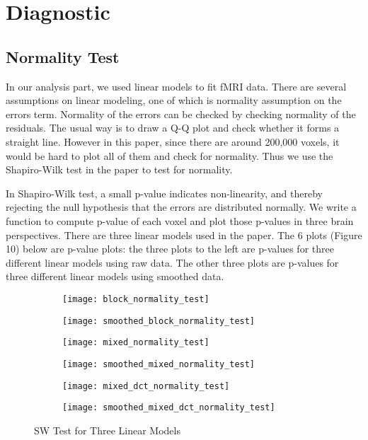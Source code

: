 \section{Diagnostic}

\subsection{Normality Test}

In our analysis part, we used linear models to fit fMRI data. There are several
assumptions on linear modeling, one of which is normality assumption on the 
errors term. Normality of the errors can be checked by checking normality of 
the residuals. The usual way is to draw a Q-Q plot and check whether it forms 
a straight line. However in this paper, since there are around 200,000 voxels,
it would be hard to plot all of them and check for normality. Thus we use 
the Shapiro-Wilk test in the paper to test for normality. \par

In Shapiro-Wilk test, a small p-value indicates non-linearity, and thereby rejecting 
the null hypothesis that the errors are distributed normally. We write a
function to compute p-value of each voxel and plot those p-values in three
brain perspectives. There are three linear models used in the paper. The 6 
plots (Figure 10) below are p-value plots: the three plots to the left are p-values 
for three different linear models using raw data. The other three plots are p-values 
for three different linear models using smoothed data. \par

\begin{figure}[!h]
\begin{subfigure}{.52\textwidth}
  \centering
  \texttt{[image: block\_normality\_test]}
\end{subfigure}%
\begin{subfigure}{.4\textwidth}
  \centering
  \texttt{[image: smoothed\_block\_normality\_test]}
\end{subfigure}
\begin{subfigure}{.52\textwidth}
  \centering
  \texttt{[image: mixed\_normality\_test]}
\end{subfigure}%
\begin{subfigure}{.4\textwidth}
  \centering
  \texttt{[image: smoothed\_mixed\_normality\_test]}
\end{subfigure}
\begin{subfigure}{.52\textwidth}
  \centering
  \texttt{[image: mixed\_dct\_normality\_test]}
\end{subfigure}%
\begin{subfigure}{.4\textwidth}
  \centering
  \texttt{[image: smoothed\_mixed\_dct\_normality\_test]}
\end{subfigure}
\caption{SW Test for Three Linear Models\label{fig:swtest}}
\end{figure}

